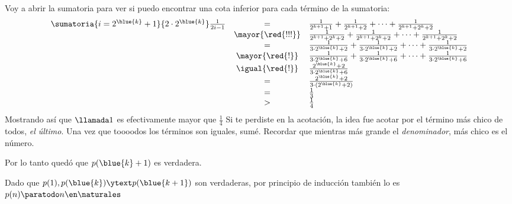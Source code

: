 \begin{enumerate}[label=\magenta{\roman*)}]
        Voy a abrir la sumatoria para ver si puedo encontrar una cota inferior para cada término de la sumatoria:
        $$
          \begin{array}{rcl}
            \sumatoria{i=2^{\blue{k}} + 1}{2 \cdot 2^{\blue{k}}} \frac{1}{2i-1}
             & =                 &
            \frac{1}{2^{k+1} + 1} +
            \frac{1}{2^{k+1} + 2} +
            \cdots +
            \frac{1}{2^{k+1} + 2^k + 2}                        \\
             & \mayor{\red{!!!}} &
            \frac{1}{2^{k+1} + 2^k + 2} +
            \frac{1}{2^{k+1} + 2^k + 2} +
            \cdots +
            \frac{1}{2^{k+1} + 2^k + 2}                        \\
             & =                 &
            \frac{1}{3 \cdot 2^{\blue{k}} + 2} +
            \frac{1}{3 \cdot 2^{\blue{k}} + 2} +
            \cdots +
            \frac{1}{3 \cdot 2^{\blue{k}} + 2}                 \\
             & \mayor{\red{!}}   &
            \frac{1}{3 \cdot 2^{\blue{k}} + 6} +
            \frac{1}{3 \cdot 2^{\blue{k}} + 6} +
            \cdots +
            \frac{1}{3 \cdot 2^{\blue{k}} + 6}                 \\
             & \igual{\red{!}}   &
            \frac{2^{\blue{k}} + 2}{3 \cdot 2^{\blue{k}} + 6}  \\
             & =                 &
            \frac{2^{\blue{k}} + 2}{3\cdot (2^{\blue{k}} + 2)} \\
             & =                 &
            \frac{1}{3}                                        \\
             & >                 &
            \frac{1}{4}
          \end{array}
        $$
        Mostrando así que $\llamada1$ es efectivamente mayor que $\frac{1}{4}$
        Si te perdiste en la acotación, la idea fue acotar por el término más chico de todos, \textit{el último}. Una vez que
        toooodos los términos son iguales, sumé. Recordar que mientras más grande el \textit{denominador}, más chico es el número.

        Por lo tanto quedó que $p(\blue{k} + 1)$ es verdadera.

        Dado que $p(1), p(\blue{k}) \ytext p(\blue{k + 1})$ son verdaderas,
        por principio de inducción también lo es $p(n) \paratodo n \en \naturales$


\end{enumerate}

